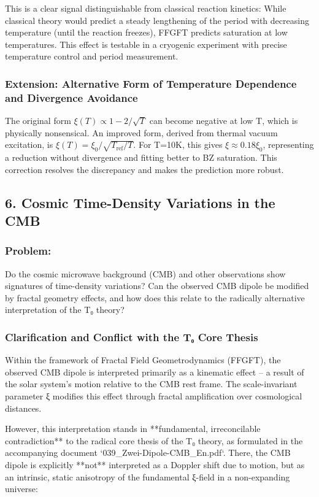 	This is a clear signal distinguishable from classical reaction kinetics: While classical theory would predict a steady lengthening of the period with decreasing temperature (until the reaction freezes), FFGFT predicts saturation at low temperatures. This effect is testable in a cryogenic experiment with precise temperature control and period measurement.
	
	\subsubsection*{Extension: Alternative Form of Temperature Dependence and Divergence Avoidance}
	The original form $\xi(T) \propto 1 - 2/\sqrt{T}$ can become negative at low T, which is physically nonsensical. An improved form, derived from thermal vacuum excitation, is $\xi(T) = \xi_0 / \sqrt{T_{\text{ref}}/T}$. For T=10K, this gives $\xi \approx 0.18 \xi_0$, representing a reduction without divergence and fitting better to BZ saturation. This correction resolves the discrepancy and makes the prediction more robust.
	
	\subsection*{6. Cosmic Time-Density Variations in the CMB}
	
	\subsubsection*{Problem:}
	Do the cosmic microwave background (CMB) and other observations show signatures of time-density variations? Can the observed CMB dipole be modified by fractal geometry effects, and how does this relate to the radically alternative interpretation of the T₀ theory?
	
	\subsubsection*{Clarification and Conflict with the T₀ Core Thesis}
	
	Within the framework of Fractal Field Geometrodynamics (FFGFT), the observed CMB dipole is interpreted primarily as a kinematic effect – a result of the solar system's motion relative to the CMB rest frame. The scale-invariant parameter ξ modifies this effect through fractal amplification over cosmological distances.
	
	However, this interpretation stands in **fundamental, irreconcilable contradiction** to the radical core thesis of the T₀ theory, as formulated in the accompanying document `039\_Zwei-Dipole-CMB\_En.pdf`. There, the CMB dipole is explicitly **not** interpreted as a Doppler shift due to motion, but as an intrinsic, static anisotropy of the fundamental ξ-field in a non-expanding universe:
	

